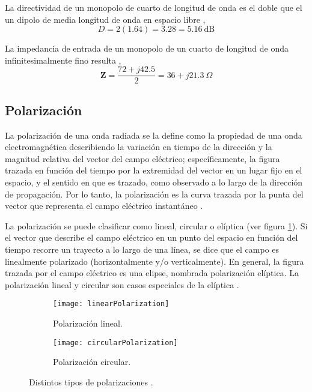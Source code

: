 La directividad de un monopolo de cuarto de longitud de onda es el doble que el un dipolo de media longitud de onda en espacio libre \cite{Stutzman2013},
\begin{equation}
  D = 2(\num{1.64}) = \num{3.28} = \SI{5.16}{\dB}
\end{equation}

La impedancia de entrada de un monopolo de un cuarto de longitud de onda infinitesimalmente fino resulta \cite{Stutzman2013},
\begin{equation}
  \bm{Z} = \dfrac{72 + j\num{42.5}}{2} = 36 + j\SI{21.3}{\Omega}
\end{equation}

\subsection{Polarización} \label{sc:polarization}

La polarización de una onda radiada se la define como la propiedad de una onda electromagnética describiendo la variación en tiempo de la dirección y la magnitud relativa del vector del campo eléctrico; específicamente, la figura trazada en función del tiempo por la extremidad del vector en un lugar fijo en el espacio, y el sentido en que es trazado, como observado a lo largo de la dirección de propagación. Por lo tanto, la polarización es la curva trazada por la punta del vector que representa el campo eléctrico instantáneo \cite{Balanis2012}.

La polarización se puede clasificar como lineal, circular o elíptica (ver figura \ref{fig:hvPolarizations}). Si el vector que describe el campo eléctrico en un punto del espacio en función del tiempo recorre un trayecto a lo largo de una línea, se dice que el campo es linealmente polarizado (horizontalmente y/o verticalmente). En general, la figura trazada por el campo eléctrico es una elipse, nombrada polarización elíptica. La polarización lineal y circular son casos especiales de la elíptica \cite{Vita2012}.

\begin{figure}[H]
  \centering
  \begin{subfigure}[b]{0.49\textwidth}
    \texttt{[image: linearPolarization]}
    \caption{Polarización lineal.}
  \end{subfigure}
  \begin{subfigure}[b]{0.49\textwidth}
    \texttt{[image: circularPolarization]}
    \caption{Polarización circular.}
  \end{subfigure}
  \caption{Distintos tipos de polarizaciones \cite{Hecht2002}.}
  \label{fig:hvPolarizations}
\end{figure}

